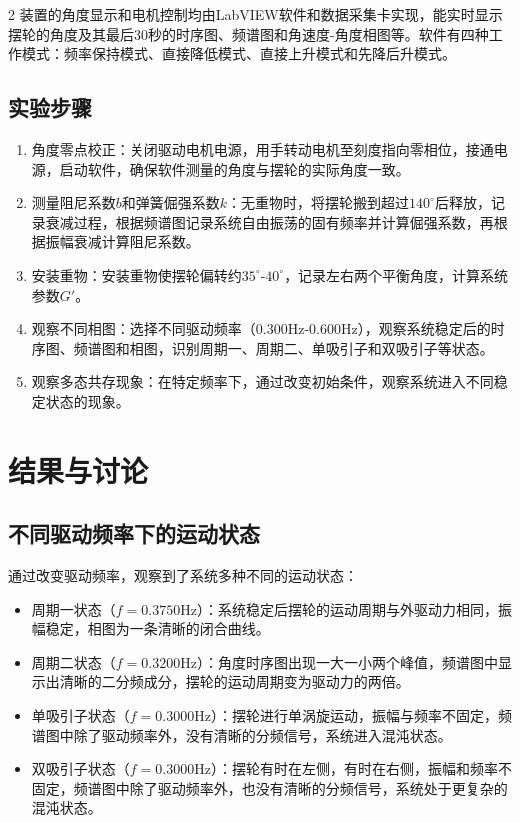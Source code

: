 \documentclass[12pt,a4paper]{article}
\begin{document}
\begin{multicols}{2}
    装置的角度显示和电机控制均由LabVIEW软件和数据采集卡实现，能实时显示摆轮的角度及其最后30秒的时序图、频谱图和角速度-角度相图等。软件有四种工作模式：频率保持模式、直接降低模式、直接上升模式和先降后升模式。

    \subsection{\heiti 实验步骤}
    
    \begin{enumerate}
        \item 角度零点校正：关闭驱动电机电源，用手转动电机至刻度指向零相位，接通电源，启动软件，确保软件测量的角度与摆轮的实际角度一致。
        \item 测量阻尼系数$b$和弹簧倔强系数$k$：无重物时，将摆轮搬到超过$140^\circ$后释放，记录衰减过程，根据频谱图记录系统自由振荡的固有频率并计算倔强系数，再根据振幅衰减计算阻尼系数。
        \item 安装重物：安装重物使摆轮偏转约$35^\circ$-$40^\circ$，记录左右两个平衡角度，计算系统参数$G'$。
        \item 观察不同相图：选择不同驱动频率（0.300Hz-0.600Hz），观察系统稳定后的时序图、频谱图和相图，识别周期一、周期二、单吸引子和双吸引子等状态。
        \item 观察多态共存现象：在特定频率下，通过改变初始条件，观察系统进入不同稳定状态的现象。
    \end{enumerate}

    \section{\heiti 结果与讨论}
    \subsection{\heiti 不同驱动频率下的运动状态}
    \songti
   
通过改变驱动频率，观察到了系统多种不同的运动状态：
    
    \begin{itemize}
        \item 周期一状态（$f=0.3750$Hz）：系统稳定后摆轮的运动周期与外驱动力相同，振幅稳定，相图为一条清晰的闭合曲线。
        \item 周期二状态（$f=0.3200$Hz）：角度时序图出现一大一小两个峰值，频谱图中显示出清晰的二分频成分，摆轮的运动周期变为驱动力的两倍。
        \item 单吸引子状态（$f=0.3000$Hz）：摆轮进行单涡旋运动，振幅与频率不固定，频谱图中除了驱动频率外，没有清晰的分频信号，系统进入混沌状态。
        \item 双吸引子状态（$f=0.3000$Hz）：摆轮有时在左侧，有时在右侧，振幅和频率不固定，频谱图中除了驱动频率外，也没有清晰的分频信号，系统处于更复杂的混沌状态。
    \end{itemize}


\end{multicols}
\end{document}

